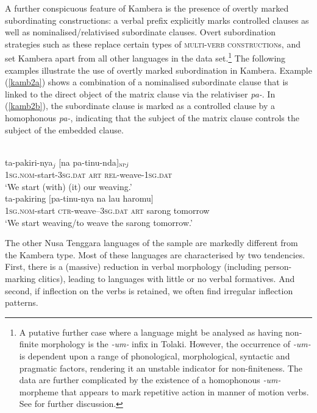 A further conspicuous feature of Kambera is the presence of overtly marked subordinating constructions: a verbal prefix explicitly marks controlled clauses as well as nominalised/relativised subordinate clauses. Overt subordination strategies such as these replace certain types of \textsc{multi-verb construction}s, and set Kambera apart from all other languages in the data set.\footnote{A putative further case where a language might be analysed as having non-finite morphology is the \textit{-um-} infix in Tolaki. However, the occurrence of \textit{-um-} is dependent upon a range of phonological, morphological, syntactic and pragmatic factors, rendering it an unstable indicator for non-finiteness. The data are further complicated by the existence of a homophonous \textit{-um-} morpheme that appears to mark repetitive action in manner of motion verbs. See \citet[117]{mead2008verb} for further discussion.} The following examples illustrate the use of overtly marked subordination in Kambera. Example (\ref{kamb2a}) shows a combination of a nominalised subordinate clause that is linked to the direct object of the matrix clause via the relativiser \textit{pa-}. In (\ref{kamb2b}), the subordinate clause is marked as a controlled clause by a homophonous \textit{pa-}, indicating that the subject of the matrix clause controls the subject of the embedded clause.

\ea 
{}\\
\ea \label{kamb2a}
\gll ta-pakiri-nya$_j$ $[$na pa-tinu-nda$]_{\textsc{np} \textit{j}}$ \\
\textsc{1}\textsc{sg}.\textsc{nom}-start-\textsc{3}\textsc{sg}.\textsc{dat} \textsc{art} \textsc{rel}-weave-\textsc{1}\textsc{sg}.\textsc{dat} \\
\glft `We start (with) (it) our weaving.' \\ 
\ex \label{kamb2b}
\gll ta-pakiring $[$pa-tinu-nya na lau haromu$]$ \\ 
\textsc{1}\textsc{sg}.\textsc{nom}-start \textsc{ctr}-weave--\textsc{3}\textsc{sg}.\textsc{dat} \textsc{art} sarong tomorrow \\
\glft `We start weaving/to weave the sarong tomorrow.'\\ 
\z
\z

The other Nusa Tenggara languages of the sample are markedly different from the Kambera type. Most of these languages are characterised by two tendencies. First, there is a (massive) reduction in verbal morphology (including person-marking clitics), leading to languages with little or no verbal formatives. And second, if inflection on the verbs is retained, we often find irregular inflection patterns. 


